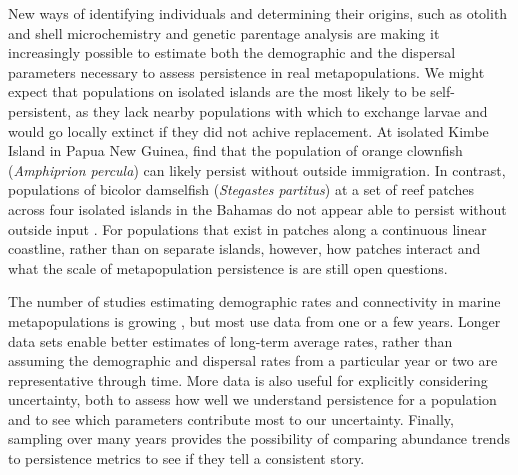 \documentclass[12pt, oneside]{article}   	%
\begin{document}
New ways of identifying individuals and determining their origins, such as otolith and shell microchemistry and genetic parentage analysis \citep[e.g.][]{wang2004sibship, wang2014estimation} are making it increasingly possible to estimate both the demographic \citep[e.g.][]{carson2011evaluating, hameed2016inverse} and the dispersal \citep[e.g.][]{almany2017larval, daloia_self-recruitment_2013} parameters necessary to assess persistence in real metapopulations. We might expect that populations on isolated islands are the most likely to be self-persistent, as they lack nearby populations with which to exchange larvae and would go locally extinct if they did not achive replacement. At isolated Kimbe Island in Papua New Guinea, \cite{salles_coral_2015} find that the population of orange clownfish (\textit{Amphiprion percula}) can likely persist without outside immigration. In contrast, populations of bicolor damselfish (\textit{Stegastes partitus}) at a set of reef patches across four isolated islands in the Bahamas do not appear able to persist without outside input \citep{johnson2018integrating}. For populations that exist in patches along a continuous linear coastline, rather than on separate islands, however, how patches interact and what the scale of metapopulation persistence is are still open questions. %

The number of studies estimating demographic rates and connectivity in marine metapopulations is growing \citep[e.g.][]{salles_coral_2015, johnson2018integrating, garavelli2018population}, but most use data from one or a few years. Longer data sets enable better estimates of long-term average rates, rather than assuming the demographic and dispersal rates from a particular year or two are representative through time. More data is also useful for explicitly considering uncertainty, both to assess how well we understand persistence for a population and to see which parameters contribute most to our uncertainty. Finally, sampling over many years provides the possibility of comparing abundance trends to persistence metrics to see if they tell a consistent story.

\end{document}
